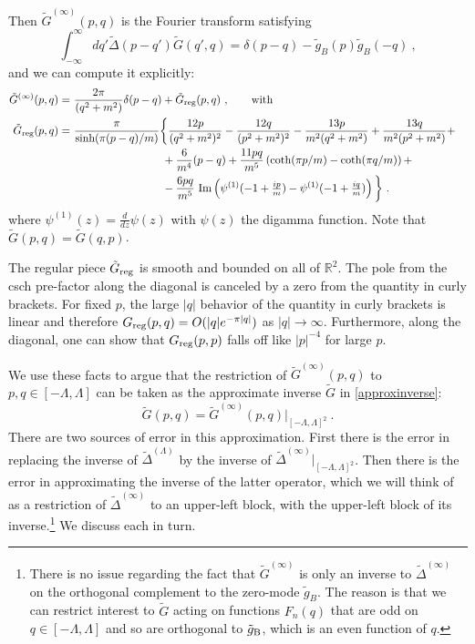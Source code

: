 \def\letter{0}\def\pr{0}\documentclass[a4paper,12pt, epsfig]{article}
\renewcommand{\sinh}{\textrm{sinh}}
\renewcommand{\(}{\begin{equation}}
\renewcommand{\)}{end{equation} \vspace{-.05in}\linebreak}
\renewcommand{\=}{\hspace{-.03in}=\hspace{-.02in}}
\renewcommand{\(}{\begin{equation}}
\renewcommand{\)}{\end{equation}}
\renewcommand{\(}{\begin{equation}}
\renewcommand{\)}{\end{equation}}
\begin{document}
Then $\tilde{G}^{(\infty)}(p,q)$ is the Fourier transform satisfying
%
\begin{equation}\label{DeltaG1}
\int_{-\infty}^{\infty} dq' \tilde{\Delta}(p - q') \tilde{G}(q',q) = \delta(p-q) - \tilde{g}_B(p)\tilde{g}_B(-q) ~,
\end{equation}
%
and we can compute it explicitly:
%
\begin{align}\label{momentumGreen}
\tilde{G}^{(\infty)}(p,q) =&~ \frac{2\pi}{(q^2 + m^2)} \delta(p-q) + \tilde{G}_{\rm reg}(p,q)~, \qquad \textrm{with} \cr
\tilde{G}_{\rm reg}(p,q) =&~ \frac{\pi}{\sinh(\pi (p-q)/m)} \bigg\{ \frac{12 p}{(q^2 + m^2)^2} - \frac{12 q}{(p^2 + m^2)^2} - \frac{13 p}{m^2 (q^2 + m^2)} + \frac{13 q}{m^2 (p^2 + m^2)} + \cr
&~ \qquad \qquad \qquad \qquad  +\frac{6}{m^4} (p-q) + \frac{11 p q}{m^5} \left( \coth(\pi p/m) - \coth(\pi q/m) \right) + \cr
&~ \qquad \qquad \qquad \qquad  - \frac{6 pq}{m^5} ~ {\rm Im} \left( \psi^{(1)}(-1 + \tfrac{i p}{m}) - \psi^{(1)}(-1 + \tfrac{i q}{m}) \right) \bigg\}~.
\end{align}
%
where $\psi^{(1)}(z) = \frac{d}{dz} \psi(z)$ with $\psi(z)$ the digamma function.  Note that $\tilde{G}(p,q) = \tilde{G}(q,p)$.

The regular piece $\tilde{G}_{\rm reg}$ is smooth and bounded on all of $\mathbb{R}^2$.  The pole from the csch pre-factor along the diagonal is canceled by a zero from the quantity in curly brackets.  For fixed $p$, the large $|q|$ behavior of the quantity in curly brackets is linear and therefore $G_{\rm reg}(p,q) = O(|q| e^{-\pi |q|})$ as $|q| \to \infty$.  Furthermore, along the diagonal, one can show that $G_{\rm reg}(p,p)$ falls off like $|p|^{-4}$ for large $p$.

We use these facts to argue that the restriction of $\tilde{G}^{(\infty)}(p,q)$ to $p,q \in [-\Lambda,\Lambda]$ can be taken as the approximate inverse $\tilde{G}$ in \eqref{approxinverse}:
%
\begin{equation}
\tilde{G}(p,q) = \tilde{G}^{(\infty)}(p,q) \bigg|_{[-\Lambda,\Lambda]^2} ~.
\end{equation}
%
There are two sources of error in this approximation.  First there is the error in replacing the inverse of $\tilde{\Delta}^{(\Lambda)}$ by the inverse of $\tilde{\Delta}^{(\infty)} |_{[-\Lambda,\Lambda]^2}$.  Then there is the error in approximating the inverse of the latter operator, which we will think of as a restriction of $\tilde{\Delta}^{(\infty)}$ to an upper-left block, with the upper-left block of its inverse.\footnote{There is no issue regarding the fact that $\tilde{G}^{(\infty)}$ is only an inverse to $\tilde{\Delta}^{(\infty)}$ on the orthogonal complement to the zero-mode $\tilde{g}_B$.  The reason is that we can restrict interest to $\tilde{G}$ acting on functions $F_n(q)$ that are odd on $q \in [-\Lambda,\Lambda]$ and so are orthogonal to $\tilde{g}_{\rm B}$, which is an even function of $q$.}  We discuss each in turn.  
\end{document}
